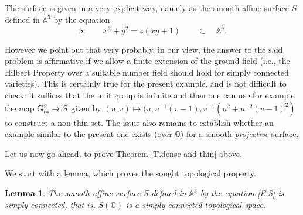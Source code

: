 \documentclass[leqno,12pt]{article} %
\def\A{{{\mathbb A}}}
\def\Q{{{\mathbb Q}}}
\def\C{{{\mathbb C}}}
\def\G{{{\mathbb G}}}
\theoremstyle{plain} %
\newtheorem{lemma}[theorem]{\indent\sc Lemma}
\theoremstyle{definition} %
\begin{document}
The surface is given in a very explicit way, namely as the smooth affine surface $S$ defined in $\A^3$ by the equation
\begin{equation}\label{E.S}
S:\qquad x^2+y^2=z(xy+1)\qquad\subset\quad  \A^3.
\end{equation}



However we point out that     very probably, in our view, 
the answer to the said problem is affirmative if we allow a finite extension of the ground field (i.e., the Hilbert Property over a suitable number field should hold  for simply connected varieties). This is certainly true for the present example, and is not difficult  to check: it suffices that the unit group is infinite and then one can use for example  the map $\G_{\rm m}^2\to S$ given by $(u,v)\mapsto (u, u^{-1}(v-1), v^{-1}(u^2+u^{-2}(v-1)^2)$ to construct a non-thin set.  The issue also remains to establish whether an example similar to the present one exists (over $\Q$) for a smooth {\it projective} surface. 

\medskip

Let us now go ahead, to prove Theorem \ref{T.dense-and-thin} above. 

We start with a lemma, which proves the sought topological property.



\begin{lemma}
The smooth affine surface $S$ defined in $\A^3$ by the equation \eqref{E.S}
is simply connected, that is, $S(\C)$ is a simply connected topological space.
\end{lemma}
\end{document}
